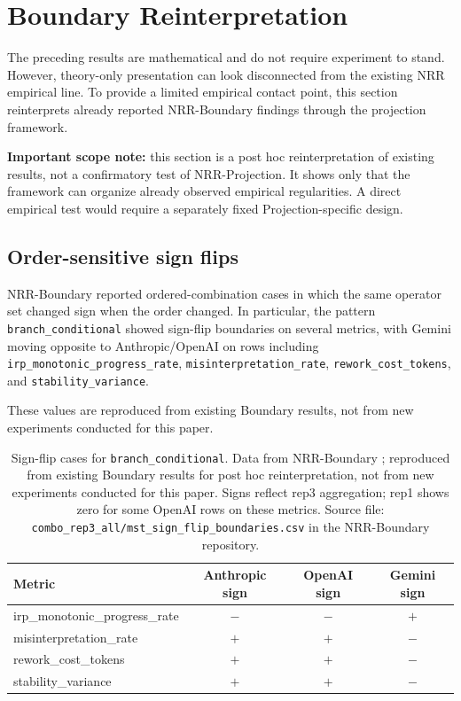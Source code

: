 \documentclass[11pt,a4paper]{article}
\begin{document}
\section{Boundary Reinterpretation}
\label{sec:boundary}

The preceding results are mathematical and do not require experiment to stand. However, theory-only presentation can look disconnected from the existing NRR empirical line. To provide a limited empirical contact point, this section reinterprets already reported NRR-Boundary findings \cite{saito2026boundary} through the projection framework.

\textbf{Important scope note:} this section is a post hoc reinterpretation of existing results, not a confirmatory test of NRR-Projection. It shows only that the framework can organize already observed empirical regularities. A direct empirical test would require a separately fixed Projection-specific design.

\subsection{Order-sensitive sign flips}

NRR-Boundary \cite{saito2026boundary} reported ordered-combination cases in which the same operator set changed sign when the order changed. In particular, the pattern \texttt{branch\_conditional} showed sign-flip boundaries on several metrics, with Gemini moving opposite to Anthropic/OpenAI on rows including \texttt{irp\_monotonic\_progress\_rate}, \texttt{misinterpretation\_rate}, \texttt{rework\_cost\_tokens}, and \texttt{stability\_variance}.

These values are reproduced from existing Boundary results, not from new experiments conducted for this paper.

\begin{table}[h]
\centering
\small
\begin{tabular}{p{5.2cm}ccc}
\toprule
Metric & Anthropic sign & OpenAI sign & Gemini sign \\
\midrule
irp\_monotonic\_progress\_rate & $-$ & $-$ & $+$ \\
misinterpretation\_rate & $+$ & $+$ & $-$ \\
rework\_cost\_tokens & $+$ & $+$ & $-$ \\
stability\_variance & $+$ & $+$ & $-$ \\
\bottomrule
\end{tabular}
\caption{Sign-flip cases for \texttt{branch\_conditional}. Data from NRR-Boundary \cite{saito2026boundary}; reproduced from existing Boundary results for post hoc reinterpretation, not from new experiments conducted for this paper. Signs reflect rep3 aggregation; rep1 shows zero for some OpenAI rows on these metrics. Source file: \texttt{combo\_rep3\_all/mst\_sign\_flip\_boundaries.csv} in the NRR-Boundary repository.}
\label{tab:boundary_signflip}
\end{table}
\end{document}
